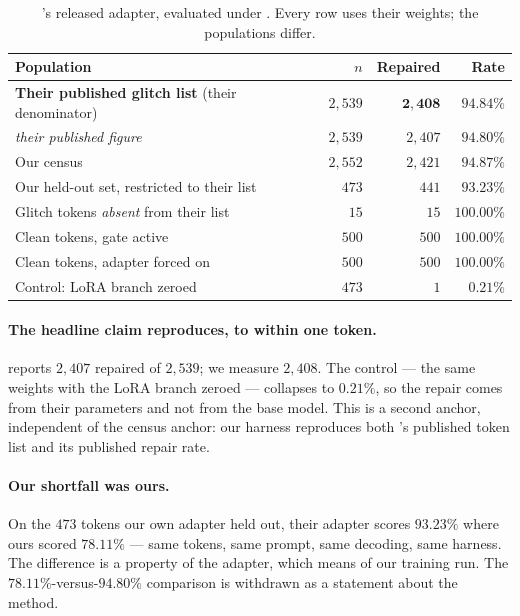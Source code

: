 \begin{table}[h]
\centering
\caption{\gc{}'s released adapter, evaluated under \Pcode{}. Every row uses their
weights; the populations differ.}
\label{tab:upstream}
\begin{tabular}{lrrr}
\toprule
Population & $n$ & Repaired & Rate \\
\midrule
\textbf{Their published glitch list} (their denominator) & $2{,}539$ & $\mathbf{2{,}408}$ & $\mathbf{94.84\%}$ \\
\quad \emph{their published figure} & $2{,}539$ & \emph{$2{,}407$} & \emph{$94.80\%$} \\
\midrule
Our \Pcode{} census & $2{,}552$ & $2{,}421$ & $94.87\%$ \\
Our held-out set, restricted to their list & $473$ & $441$ & $93.23\%$ \\
Glitch tokens \emph{absent} from their list & $15$ & $15$ & $100.00\%$ \\
\midrule
Clean tokens, gate active & $500$ & $500$ & $100.00\%$ \\
Clean tokens, adapter forced on & $500$ & $500$ & $100.00\%$ \\
Control: LoRA branch zeroed & $473$ & $1$ & $0.21\%$ \\
\bottomrule
\end{tabular}
\end{table}

\paragraph{The headline claim reproduces, to within one token.} \gc{} reports
$2{,}407$ repaired of $2{,}539$; we measure $2{,}408$. The control --- the same
weights with the LoRA branch zeroed --- collapses to $0.21\%$, so the repair comes
from their parameters and not from the base model. This is a second anchor,
independent of the census anchor: our harness reproduces both \gc{}'s published
token list and its published repair rate.

\paragraph{Our shortfall was ours.} On the $473$ tokens our own adapter held out,
their adapter scores $93.23\%$ where ours scored $78.11\%$ --- same tokens, same
prompt, same decoding, same harness. The difference is a property of the adapter,
which means of our training run. The $78.11\%$-versus-$94.80\%$ comparison is
withdrawn as a statement about the method.


